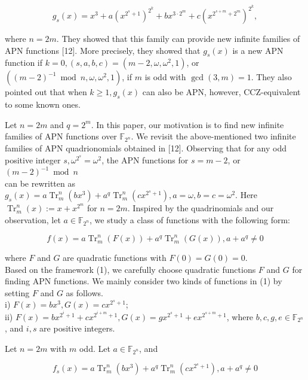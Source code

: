 \documentclass[10pt]{article}
\begin{document}
$$
g_{s}(x)=x^{3}+a\left(x^{2^{s}+1}\right)^{2^{k}}+b x^{3 \cdot 2^{m}}+c\left(x^{2^{s+m}+2^{m}}\right)^{2^{k}},
$$

where $n=2 m$. They showed that this family can provide new infinite families of APN functions [12]. More precisely, they showed that $g_{s}(x)$ is a new APN function if $k=0,(s, a, b, c)=\left(m-2, \omega, \omega^{2}, 1\right)$, or $\left((m-2)^{-1} \bmod n, \omega, \omega^{2}, 1\right)$, if $m$ is odd with $\operatorname{gcd}(3, m)=1$. They also pointed out that when $k \geq 1, g_{s}(x)$ can also be APN, however, CCZ-equivalent to some known ones.

Let $n=2 m$ and $q=2^{m}$. In this paper, our motivation is to find new infinite families of APN functions over $\mathbb{F}_{2^{n}}$. We revisit the above-mentioned two infinite families of APN quadrionomials obtained in [12]. Observing that for any odd positive integer $s, \omega^{2^{s}}=\omega^{2}$, the APN functions for $s=m-2$, or $(m-2)^{-1} \bmod n$\\
can be rewritten as $g_{s}(x)=a \operatorname{Tr}_{m}^{n}\left(b x^{3}\right)+a^{q} \operatorname{Tr}_{m}^{n}\left(c x^{2^{s}+1}\right), a=\omega, b=c=\omega^{2}$. Here $\operatorname{Tr}_{m}^{n}(x):=x+x^{2^{m}}$ for $n=2 m$. Inspired by the quadrinomials and our observation, let $a \in \mathbb{F}_{2^{n}}$, we study a class of functions with the following form:


\begin{equation*}
f(x)=a \operatorname{Tr}_{m}^{n}(F(x))+a^{q} \operatorname{Tr}_{m}^{n}(G(x)), a+a^{q} \neq 0 \tag{1}
\end{equation*}


where $F$ and $G$ are quadratic functions with $F(0)=G(0)=0$.\\
Based on the framework (1), we carefully choose quadratic functions $F$ and $G$ for finding APN functions. We mainly consider two kinds of functions in (1) by setting $F$ and $G$ as follows.\\
i) $F(x)=b x^{3}, G(x)=c x^{2^{s}+1}$;\\
ii) $F(x)=b x^{2^{i}+1}+c x^{2^{i+m}+1}, G(x)=g x^{2^{s}+1}+e x^{2^{s+m}+1}$, where $b, c, g, e \in \mathbb{F}_{2^{n}}$, and $i, s$ are positive integers.

Let $n=2 m$ with $m$ odd. Let $a \in \mathbb{F}_{2^{n}}$, and

$$
f_{s}(x)=a \operatorname{Tr}_{m}^{n}\left(b x^{3}\right)+a^{q} \operatorname{Tr}_{m}^{n}\left(c x^{2^{s}+1}\right), a+a^{q} \neq 0
$$
\end{document}
